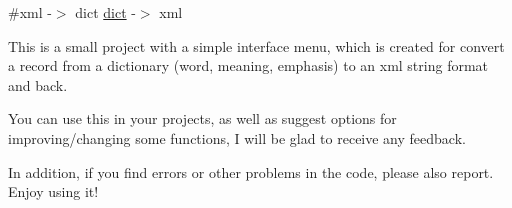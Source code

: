 \#xml -\/$>$ dict \mbox{\hyperlink{structdict}{dict}} -\/$>$ xml

This is a small project with a simple interface menu, which is created for convert a record from a dictionary (word, meaning, emphasis) to an xml string format and back.

You can use this in your projects, as well as suggest options for improving/changing some functions, I will be glad to receive any feedback.

In addition, if you find errors or other problems in the code, please also report. Enjoy using it! 
